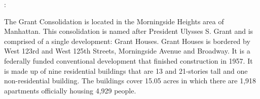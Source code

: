 :    

  

The Grant Consolidation is located in the Morningside Heights area of Manhattan. This consolidation is named after President Ulysses S. Grant and is comprised of a single development: Grant Houses. Grant Houses is bordered by West 123rd and West 125th Streets, Morningside Avenue and Broadway. It is a federally funded conventional development that finished construction in 1957. It is made up of nine residential buildings that are 13 and 21-stories tall and one non-residential building. The buildings cover 15.05 acres in which there are 1,918 apartments officially housing 4,929 people.   